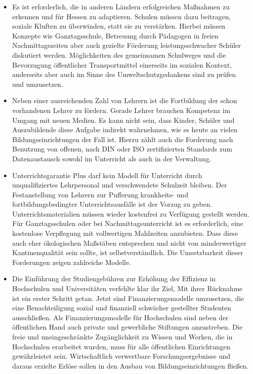 \documentclass[10pt,a4paper,twocolumn,twoside,titlepage]{article}
\begin{document}

\begin{itemize}
\item Es ist erforderlich, die in anderen Ländern erfolgreichen Maßnahmen zu erkennen und für Hessen zu adaptieren. Schulen müssen dazu beitragen, soziale Kluften zu überwinden, statt sie zu verstärken. Hierbei müssen Konzepte wie Ganztagsschule, Betreuung durch Pädagogen in freien Nachmittagszeiten aber auch gezielte Förderung leistungsschwacher Schüler diskutiert werden. Möglichkeiten des gemeinsamen Schulweges und die Bevorzugung öffentlicher Transportmittel einerseits im sozialen Kontext, anderseits aber auch im Sinne des Umweltschutzgedankens sind zu prüfen und umzusetzen.
\item Neben einer ausreichenden Zahl von Lehrern ist die Fortbildung der schon vorhandenen Lehrer zu fördern. Gerade Lehrer brauchen Kompetenz im Umgang mit neuen Medien. Es kann nicht sein, dass Kinder, Schüler und Auszubildende diese Aufgabe indirekt wahrnehmen, wie es heute an vielen Bildungseinrichtungen der Fall ist. Hierzu zählt auch die Forderung nach Benutzung von offenen, nach DIN oder ISO zertifizierten Standards zum Datenaustausch sowohl im Unterricht als auch in der Verwaltung.
\item Unterrichtsgarantie Plus darf kein Modell für Unterricht durch unqualifiziertes Lehrpersonal und verschwendete Schulzeit bleiben. Der Festanstellung von Lehrern zur Pufferung krankheits- und fortbildungsbedingter Unterrichtsausfälle ist der Vorzug zu geben. Unterrichtsmaterialien müssen wieder kostenfrei zu Verfügung gestellt werden. Für Ganztagsschulen oder bei Nachmittagsunterricht ist es erforderlich, eine kostenlose Verpflegung mit vollwertigen Mahlzeiten anzubieten. Dass diese auch eher ökologischen Maßstäben entsprechen und nicht von minderwertiger Kantinenqualität sein sollte, ist selbstverständlich. Die Umsetzbarkeit dieser Forderungen zeigen zahlreiche Modelle.
\item Die Einführung der Studiengebühren zur Erhöhung der Effizienz in Hochschulen und Universitäten verfehlte klar ihr Ziel, Mit ihrer Rücknahme ist ein erster Schritt getan. Jetzt sind Finanzierungsmodelle umzusetzen, die eine Benachteiligung sozial und finanziell schwächer gestellter Studenten ausschließen. Als Finanzierungsmodelle für Hochschulen sind neben der öffentlichen Hand auch private und gewerbliche Stiftungen anzustreben. Die freie und uneingeschränkte Zugänglichkeit zu Wissen und Werken, die in Hochschulen erarbeitet wurden, muss für alle öffentlichen Einrichtungen gewährleistet sein. Wirtschaftlich verwertbare Forschungsergebnisse und daraus erzielte Erlöse sollen in den Ausbau von Bildungseinrichtungen fließen.
\end{itemize}
\end{document}
